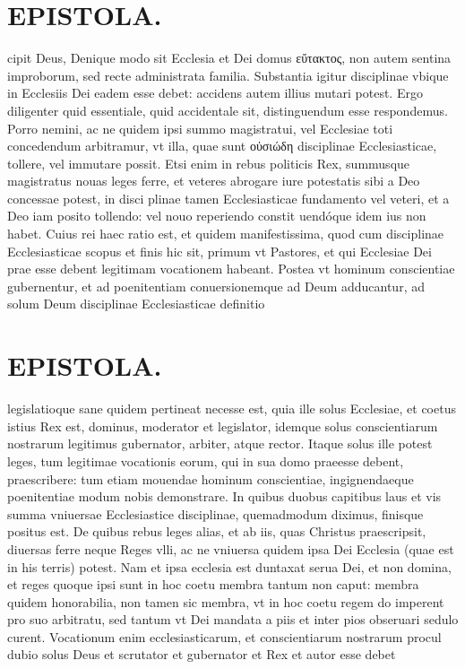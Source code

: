 \documentclass{article}
\begin{document}
\begin{pages}
\section*{EPISTOLA. }\pstart cipit Deus, Denique modo sit Ecclesia et Dei domus εὔτακτος, non autem sentina improborum, sed recte administrata familia. Substantia igitur disciplinae vbique in Ecclesiis Dei eadem esse debet: accidens autem illius mutari potest. Ergo diligenter quid essentiale, quid accidentale sit, distinguendum esse respondemus. Porro nemini, ac ne quidem ipsi summo magistratui, vel Ecclesiae toti concedendum arbitramur, vt illa, quae sunt οὐσιώδη disciplinae Ecclesiasticae, tollere, vel immutare possit. Etsi enim in rebus politicis Rex, summusque magistratus nouas leges ferre, et veteres abrogare iure potestatis sibi a Deo concessae potest, in disci plinae tamen Ecclesiasticae fundamento vel veteri, et a Deo iam posito tollendo: vel nouo reperiendo constit uendóque idem ius non habet. Cuius rei haec ratio est, et quidem manifestissima, quod cum disciplinae Ecclesiasticae scopus et finis hic sit, primum vt Pastores, et qui Ecclesiae Dei prae esse debent legitimam vocationem habeant. Postea vt hominum conscientiae gubernentur, et ad poenitentiam conuersionemque ad Deum adducantur, ad solum Deum disciplinae Ecclesiasticae definitio  \pend
\section*{EPISTOLA. }\pstart legislatioque sane quidem pertineat necesse est, quia ille solus Ecclesiae, et coetus istius Rex est, dominus, moderator et legislator, idemque solus conscientiarum nostrarum legitimus gubernator, arbiter, atque rector. Itaque solus ille potest leges, tum legitimae vocationis eorum, qui in sua domo praeesse debent, praescribere: tum etiam mouendae hominum conscientiae, ingignendaeque poenitentiae modum nobis demonstrare. In quibus duobus capitibus laus et vis summa vniuersae Ecclesiastice disciplinae, quemadmodum diximus, finisque positus est. De quibus rebus leges alias, et ab iis, quas Christus praescripsit, diuersas ferre neque Reges vlli, ac ne vniuersa quidem ipsa Dei Ecclesia (quae est in his terris) potest. Nam et ipsa ecclesia est duntaxat serua Dei, et non domina, et reges quoque ipsi sunt in hoc coetu membra tantum non caput: membra quidem honorabilia, non tamen sic membra, vt in hoc coetu regem do imperent pro suo arbitratu, sed tantum vt Dei mandata a piis et inter pios obseruari sedulo curent. Vocationum enim ecclesiasticarum, et conscientiarum nostrarum procul dubio solus Deus et scrutator et gubernator et Rex et autor esse debet  \pend

\end{pages}
\end{document}
